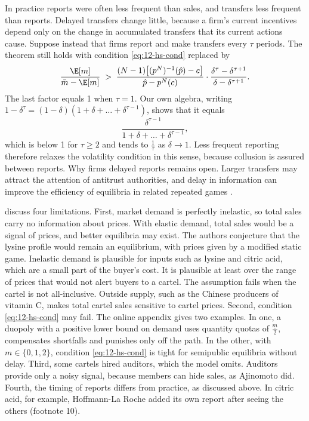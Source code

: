 In practice reports were often less frequent than sales, and transfers less frequent than reports. Delayed
transfers change little, because a firm's current incentives depend only on the change in accumulated transfers
that its current actions cause. Suppose instead that firms report and make transfers every $\tau$ periods. The
theorem still holds with condition \eqref{eq:12-hs-cond} replaced by \citep[p.~2441]{HarringtonSkrzypacz2011}
\begin{equation}\label{eq:12-hs-tau}
  \frac{\E[m]}{\bar m - \E[m]} \;>\; \frac{(N-1)\bigl[(p^N)^{-1}(\hat p) - c\bigr]}{\hat p - p^N(c)}
  \cdot\frac{\delta^\tau - \delta^{\tau+1}}{\delta - \delta^{\tau+1}} .
\end{equation}
The last factor equals 1 when $\tau = 1$. Our own algebra, writing
$1 - \delta^\tau = (1-\delta)(1 + \delta + \dots + \delta^{\tau-1})$, shows that it equals
\begin{equation*}
  \frac{\delta^{\tau-1}}{1 + \delta + \dots + \delta^{\tau-1}},
\end{equation*}
which is below 1 for $\tau \ge 2$ and tends to $\frac{1}{\tau}$ as $\delta \to 1$. Less frequent reporting
therefore relaxes the volatility condition in this sense, because collusion is assured between reports. Why firms
delayed reports remains open. Larger transfers may attract the attention of antitrust authorities, and delay in
information can improve the efficiency of equilibria in related repeated games
\citep[p.~2441]{HarringtonSkrzypacz2011}.

\citet[pp.~2438--2441]{HarringtonSkrzypacz2011} discuss four limitations. First, market demand is perfectly
inelastic, so total sales carry no information about prices. With elastic demand, total sales would be a signal of
prices, and better equilibria may exist. The authors conjecture that the lysine profile would remain an equilibrium,
with prices given by a modified static game. Inelastic demand is plausible for inputs such as lysine and citric
acid, which are a small part of the buyer's cost. It is plausible at least over the range of prices that would not
alert buyers to a cartel.
The assumption fails when the cartel is not all-inclusive. Outside supply, such as the Chinese producers of
vitamin C, makes total cartel sales sensitive to cartel prices. Second, condition \eqref{eq:12-hs-cond} may fail.
The online appendix gives two examples. In one, a duopoly with a positive lower bound on demand uses quantity quotas
of $\frac{\underline m}{2}$, compensates shortfalls and punishes only off the path. In the other, with
$m \in \{0, 1, 2\}$, condition \eqref{eq:12-hs-cond} is tight for semipublic equilibria without delay. Third,
some cartels hired auditors, which the model omits. Auditors provide only a noisy signal, because members can hide
sales, as Ajinomoto did. Fourth, the timing of reports differs from practice, as discussed above. In citric acid,
for example, Hoffmann-La Roche added its own report after seeing the others (footnote 10).

